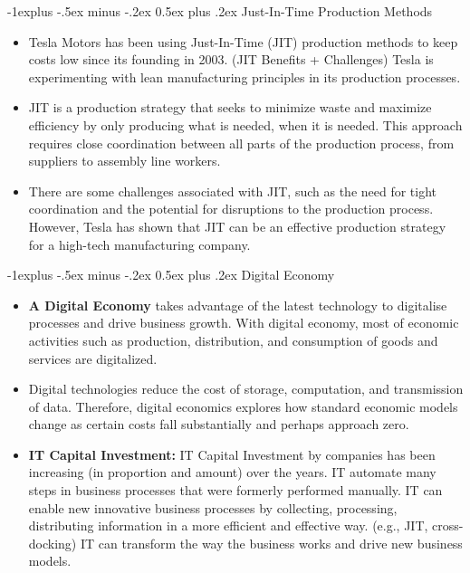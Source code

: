 \documentclass[12pt, landscape]{article}
\makeatletter
\renewcommand{\subsection}{\@startsection{subsection}{2}{0mm}%
                                {-1explus -.5ex minus -.2ex}%
                                {0.5ex plus .2ex}%
                                {\normalfont\normalsize\bfseries}}
\makeatother
\begin{document}
\begin{multicols*}{3}
\subsection{Just-In-Time Production Methods}
\begin{itemize}
\item Tesla Motors has been using Just-In-Time (JIT) production methods to keep costs low since its founding in 2003. (JIT Benefits + Challenges) Tesla is experimenting with lean manufacturing principles in its production processes.
\item JIT is a production strategy that seeks to minimize waste and maximize efficiency by only producing what is needed, when it is needed. This approach requires close coordination between all parts of the production process, from suppliers to assembly line workers.
\item There are some challenges associated with JIT, such as the need for tight coordination and the potential for disruptions to the production process. However, Tesla has shown that JIT can be an effective production strategy for a high-tech manufacturing company.
\end{itemize}

\subsection{Digital Economy}
\begin{itemize}
\item \textbf{A Digital Economy} takes advantage of the latest technology to digitalise processes and drive business growth. With digital economy, most of economic activities such as production, distribution, and consumption of goods and services are digitalized.
\item Digital technologies reduce the cost of storage, computation, and transmission of data. Therefore, digital economics explores how standard economic models change as certain costs fall substantially and perhaps approach zero.
\item \textbf{IT Capital Investment:} IT Capital Investment by companies has been increasing (in proportion and amount) over the years. IT automate many steps in business processes that were formerly performed manually. IT can enable new innovative business processes by collecting, processing, distributing information in a more efficient and effective way. (e.g., JIT, cross-docking) IT can transform the way the business works and drive new business models.
\end{itemize}


\end{multicols*}
\end{document}
